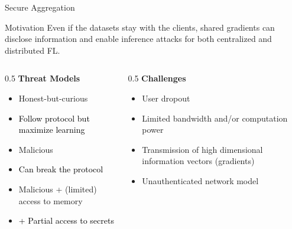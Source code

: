 \documentclass[t,aspectratio=169]{beamer}
\begin{document}
\begin{frame}{Secure Aggregation}
    
\begin{alertblock}{Motivation}
    Even if the datasets stay with the clients, shared gradients can disclose information and enable inference attacks for both centralized and distributed FL.
\end{alertblock}
\begin{columns}
\begin{column}{0.5\textwidth}
\textbf{Threat Models}
\begin{itemize}
    \item Honest-but-curious
    \item[] \textcolor{black}{Follow protocol but maximize learning}
    \item Malicious
    \item[] \textcolor{black}{Can break the protocol}
    \item Malicious + (limited) access to memory
    \item[] \textcolor{black}{+ Partial access to secrets}
\end{itemize} 
\end{column}
\begin{column}{0.5\textwidth}
    \textbf{Challenges}
    \begin{itemize}
        \item User dropout
        \item Limited bandwidth and/or computation power
        \item Transmission of high dimensional information vectors (gradients)
        \item Unauthenticated network model
    \end{itemize}
\end{column}
\end{columns}
\end{frame}
\end{document}
